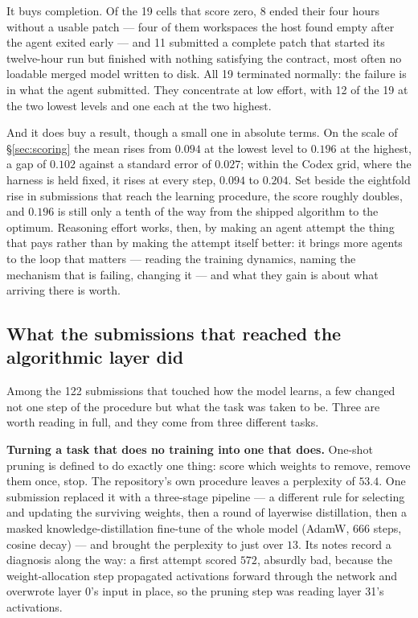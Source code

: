 It buys completion. Of the 19 cells that score zero, 8 ended their four hours without a usable patch
--- four of them workspaces the host found empty after the agent exited early --- and 11 submitted a
complete patch that started its twelve-hour run but finished with nothing satisfying the contract,
most often no loadable merged model written to disk. All 19 terminated normally: the failure is in what
the agent submitted. They concentrate at low effort, with 12 of the 19 at the two lowest levels and
one each at the two highest.

And it does buy a result, though a small one in absolute terms. On the scale of \S\ref{sec:scoring}
the mean rises from $0.094$ at the lowest level to $0.196$ at the highest, a gap of $0.102$ against a
standard error of $0.027$; within the Codex grid, where the harness is held fixed, it rises at every
step, $0.094$ to $0.204$. Set beside the eightfold rise in submissions that reach the learning
procedure, the score roughly doubles, and $0.196$ is still only a tenth of the way from the shipped
algorithm to the optimum. Reasoning effort works, then, by making an agent attempt the thing that
pays rather than by making the attempt itself better: it brings more agents to the loop that
matters --- reading the training dynamics, naming the mechanism that is failing, changing it --- and
what they gain is about what arriving there is worth.

\subsection{What the submissions that reached the algorithmic layer did}
\label{sec:reached}

Among the 122 submissions that touched how the model learns, a few changed not one step of the
procedure but what the task was taken to be. Three are worth reading in full, and they come from
three different tasks.

\textbf{Turning a task that does no training into one that does.} One-shot pruning is defined to do
exactly one thing: score which weights to remove, remove them once, stop. The repository's own
procedure leaves a perplexity of $53.4$. One submission replaced it with a three-stage pipeline ---
a different rule for selecting and updating the surviving weights, then a round of layerwise
distillation, then a masked knowledge-distillation fine-tune of the whole model (AdamW, 666 steps,
cosine decay) --- and brought the perplexity to just over $13$. Its notes record a diagnosis along
the way: a first attempt scored $572$, absurdly bad, because the weight-allocation step propagated
activations forward through the network and overwrote layer 0's input in place, so the pruning step
was reading layer 31's activations.


